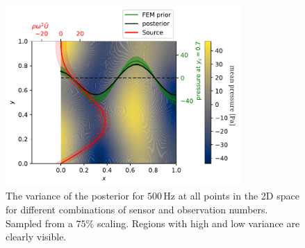 \documentclass[%
  a4paper,oneside,%
  11pt,%
  smallchapters,
  style=printdev,
  extramargin,
  green,%
  rgb, <cmyk>
  ]{tubsbook}
\begin{document}
\begin{figure}[!ht]
\includegraphics[width=0.8\textwidth]{../../Python/Results/2D/75procent_no_d/SolutionCustomPosterior.pdf}
\centering
\caption[Source, prior and posterior for the 2D example at 500Hz]{The variance of the posterior for $500\, \mathrm{Hz}$ at all points in the 2D space for different combinations of sensor and observation numbers. Sampled from a $75\%$ scaling. Regions with high and low variance are clearly visible.}
\label{fig:75proc_no_d_overview}
\end{figure}
\end{document}
